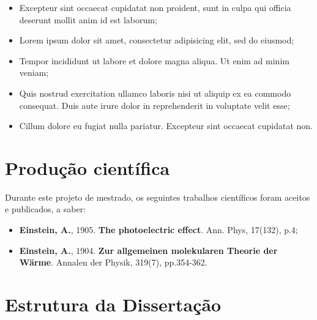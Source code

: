 \begin{itemize}
	\item Excepteur sint occaecat cupidatat non proident, sunt in culpa qui officia deserunt mollit anim id est laborum;
	\item Lorem ipsum dolor sit amet, consectetur adipisicing elit, sed do eiusmod;
	\item Tempor incididunt ut labore et dolore magna aliqua. Ut enim ad minim veniam;
	\item Quis nostrud exercitation ullamco laboris nisi ut aliquip ex ea commodo consequat. Duis aute irure dolor in reprehenderit in voluptate velit esse;
	\item Cillum dolore eu fugiat nulla pariatur. Excepteur sint occaecat cupidatat non.
\end{itemize}

\section{Produção científica}\label{sec:producao}
Durante este projeto de mestrado, os seguintes trabalhos científicos foram aceitos e publicados, a saber:

\begin{itemize}
	\item \textbf{Einstein, A.}, 1905. \textbf{The photoelectric effect}. Ann. Phys, 17(132), p.4;
	\item \textbf{Einstein, A.}, 1904. \textbf{Zur allgemeinen molekularen Theorie der Wärme}. Annalen der Physik, 319(7), pp.354-362.
\end{itemize}

\section{Estrutura da Dissertação}\label{sec:estrutura}
\lipsum[4-5]
\lipsum[1-2]
\lipsum[1-4]
\lipsum[3-2]